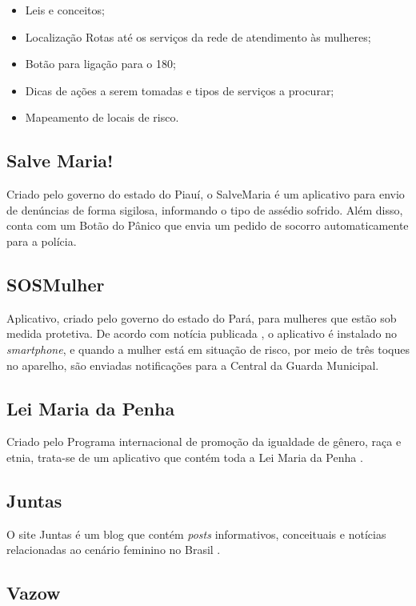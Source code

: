 \begin{itemize}
	\item Leis e conceitos;
	\item Localização Rotas até os serviços da rede de atendimento às mulheres;
	\item Botão para ligação para o 180;
	\item Dicas de ações a serem tomadas e tipos de serviços a procurar; 
	\item Mapeamento de locais de risco.
\end{itemize}

\subsection*{Salve Maria!}
Criado pelo governo do estado do Piauí, o SalveMaria \cite{salvemaria} é um aplicativo para envio de denúncias
de forma sigilosa, informando o tipo de assédio sofrido.
Além disso, conta com um Botão do Pânico que envia um pedido de socorro automaticamente para a polícia.

\subsection*{SOSMulher}
Aplicativo, criado pelo governo do estado do Pará, para mulheres que estão sob medida protetiva. 
De acordo com notícia publicada \cite{sosmulher}, 
o aplicativo é instalado no \textit{smartphone}, e quando a mulher está em situação de risco, por meio de três toques no aparelho, são enviadas notificações para a Central da Guarda Municipal.

\subsection*{Lei Maria da Penha}
Criado pelo Programa internacional de promoção da igualdade de gênero, raça e etnia, trata-se de um
aplicativo que contém toda a Lei Maria da Penha \cite{leimariadapenha}.

\subsection*{Juntas}
O site Juntas é um blog que contém \textit{posts} informativos, conceituais e notícias 
relacionadas ao cenário feminino no Brasil \cite{juntas}.

\subsection*{Vazow}

